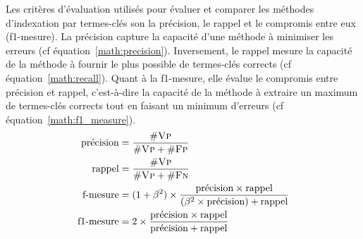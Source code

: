     Les critères d'évaluation utilisés pour évaluer et comparer les méthodes
    d'indexation par termes-clés son la précision, le rappel et le compromis
    entre eux (f1-mesure). La précision capture la capacité d'une méthode à
    minimiser les erreurs (cf équation~\ref{math:precision}). Inversement, le
    rappel mesure la capacité de la méthode à fournir le plus possible de
    termes-clés corrects (cf équation~\ref{math:recall}). Quant à la f1-mesure, elle évalue le compromis
    entre précision et rappel, c'est-à-dire la capacité de la méthode à extraire
    un maximum de termes-clés corrects tout en faisant un minimum d'erreurs (cf
    équation~\ref{math:f1_measure}).
    \begin{align}
      \text{précision} &= \frac{\#\textsc{Vp}}{\#\textsc{Vp} + \#\textsc{Fp}} \label{math:precision}\\
      \text{rappel} &= \frac{\#\textsc{Vp}}{\#\textsc{Vp} + \#\textsc{Fn}} \label{math:recall}\\
      \text{f-mesure} &= (1 + \beta^2) \times \frac{\text{précision} \times \text{rappel}}{(\beta^2 \times \text{précision}) + \text{rappel}} \label{math:f_measure}\\
      \text{f1-mesure} &= 2 \times \frac{\text{précision} \times \text{rappel}}{\text{précision} + \text{rappel}} \label{math:f1_measure}
    \end{align}
      
